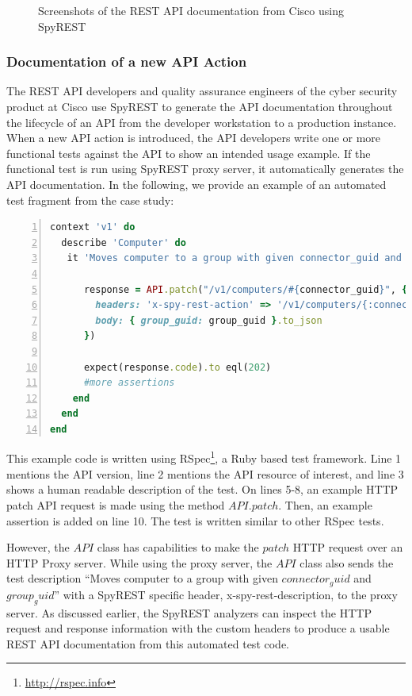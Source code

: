 \documentclass[10pt, conference]{IEEEtran}
\begin{document}
\begin{figure}
{\label{fig:screenshot_response}
}
\caption{Screenshots of the REST API documentation from Cisco using SpyREST}
\label{fig:screenshot}
\end{figure}

\subsubsection{Documentation of a new API Action}
The REST API developers and quality assurance engineers of the cyber security product at Cisco use SpyREST to generate the API documentation throughout the lifecycle of an API from the developer workstation to a production instance. When a new API action is introduced, the API developers write one or more functional tests against the API to show an intended usage example. If the functional test is run using SpyREST proxy server, it automatically generates the API documentation. In the following, we provide an example of an automated test fragment from the case study:

\begin{lstlisting}[language=Ruby,breaklines=true,showspaces=false,showstringspaces=false,numbers=left,xleftmargin=2em]
context 'v1' do
  describe 'Computer' do
   it 'Moves computer to a group with given connector_guid and group_guid' do

      response = API.patch("/v1/computers/#{connector_guid}", {
        headers: 'x-spy-rest-action' => '/v1/computers/{:connector_guid}',
        body: { group_guid: group_guid }.to_json
      })

      expect(response.code).to eql(202)
      #more assertions
    end
  end
end
\end{lstlisting}


This example code is written using RSpec\footnote{\url{http://rspec.info}}, a Ruby based test framework. Line 1 mentions the API version, line 2 mentions the API resource of interest, and line 3 shows a human readable description of the test. On lines 5-8, an example HTTP patch API request is made using the method $API.patch$. Then, an example assertion is added on line 10. The test is written similar to other RSpec tests.

However, the $API$ class has capabilities to make the $patch$ HTTP request over an HTTP Proxy server. While using the proxy server, the $API$ class also sends the test description ``Moves computer to a group with given $connector_guid$ and $group_guid$'' with a SpyREST specific header, x-spy-rest-description, to the proxy server. As discussed earlier, the SpyREST analyzers can inspect the HTTP request and response information with the custom headers to produce a usable REST API documentation from this automated test code.
\end{document}
